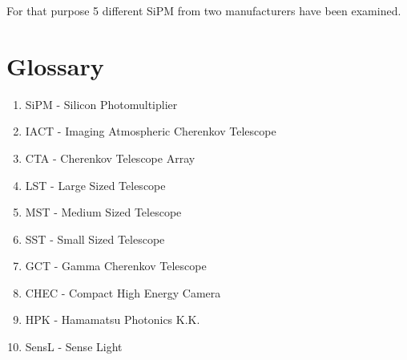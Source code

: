 \documentclass[12pt,article,type=msc,colorback,accentcolor=tud9c]{tudthesis}
\begin{document}
For that purpose 5 different SiPM from two manufacturers have been examined.

\newpage
\section{\Large Glossary}
\begin{enumerate}
\item SiPM - Silicon Photomultiplier
\item IACT - Imaging Atmospheric Cherenkov Telescope
\item CTA - Cherenkov Telescope Array
\item LST - Large Sized Telescope
\item MST - Medium Sized Telescope
\item SST - Small Sized Telescope
\item GCT - Gamma Cherenkov Telescope
\item CHEC - Compact High Energy Camera



\item HPK - Hamamatsu Photonics K.K.
\item SensL - Sense Light
\end{enumerate}


\newpage
\end{document}

